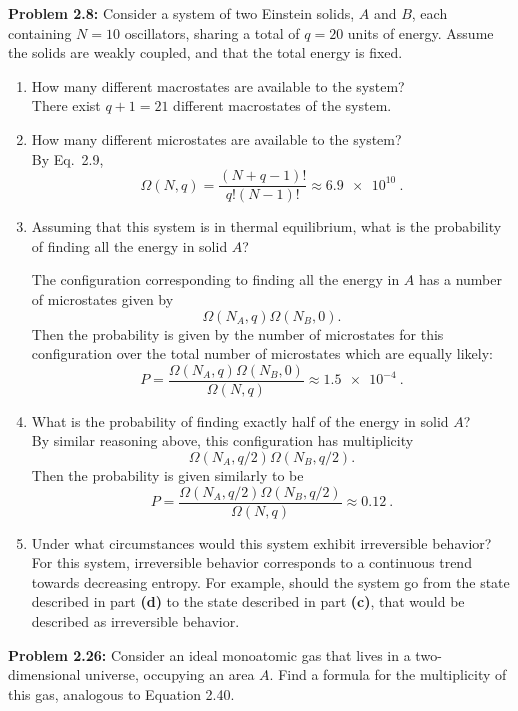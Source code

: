 \documentclass[a4paper, 12pt]{config/homework}
\begin{document}
\pagebreak\noindent
\textbf{Problem 2.8:} Consider a system of two Einstein solids, \(A\) and \(B\), each containing \(N=10\) oscillators, sharing a total of \(q=20\) units of energy. Assume the solids are weakly coupled, and that the total energy is fixed.
\begin{enumerate}[label=\textbf{(\alph*)}]
\item How many different macrostates are available to the system?\\\noindent
There exist \(q+1=21\) different macrostates of the system.

\item How many different microstates are available to the system?\\\noindent
By Eq.\ 2.9,
\[\Omega(N,q)=\frac{(N+q-1)!}{q!(N-1)!}\approx\qty{6.9e10}{}.\]


\item Assuming that this system is in thermal equilibrium, what is the probability of finding all the energy in solid \(A\)?\\
\bigskip\noindent

The configuration corresponding to finding all the energy in \(A\) has a number of microstates given by
\[\Omega(N_A,q)\Omega(N_B,0).\]
Then the probability is given by the number of microstates for this configuration over the total number of microstates which are equally likely:
\[P = \frac{\Omega(N_A,q)\Omega(N_B,0)}{\Omega(N,q)} \approx \qty{1.5e-4}{}.\]


\item What is the probability of finding exactly half of the energy in solid \(A\)?\\\noindent
By similar reasoning above, this configuration has multiplicity
\[\Omega(N_A,q/2)\Omega(N_B,q/2).\]
Then the probability is given similarly to be
\[P = \frac{\Omega(N_A,q/2)\Omega(N_B,q/2)}{\Omega(N,q)}\approx\qty{0.12}{}.\]


\item Under what circumstances would this system exhibit irreversible behavior? \\\noindent
For this system, irreversible behavior corresponds to a continuous trend towards decreasing entropy. For example, should the system go from the state described in part \textbf{(d)} to the state described in part \textbf{(c)}, that would be described as irreversible behavior.


\end{enumerate}
\pagebreak\noindent
\textbf{Problem 2.26:} Consider an ideal monoatomic gas that lives in a two-dimensional universe, occupying an area \(A\). Find a formula for the multiplicity of this gas, analogous to Equation 2.40.
\bigskip\noindent\\
\end{document}
